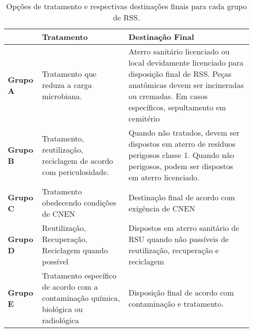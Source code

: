 \begin{table}[htbp]
  \centering
  \caption{Opções de tratamento e respectivas destinações finais para cada grupo de RSS.}
    \begin{tabular}{|p{5em}|p{13.645em}|p{18.07em}|}
    \toprule
    \rowcolor[rgb]{ .969,  .588,  .275} \multicolumn{1}{|c|}{} & \textbf{Tratamento} & \textbf{Destinação Final} \\
    \midrule
    \rowcolor[rgb]{ .976,  .737,  .541} \textbf{Grupo A} & Tratamento que reduza a carga microbiana. & Aterro sanitário licenciado ou local devidamente licenciado para disposição final de RSS. Peças anatômicas devem ser incineradas ou cremadas. Em casos específicos, sepultamento em cemitério \\
    \midrule
    \rowcolor[rgb]{ .992,  .914,  .851} \textbf{Grupo B} & Tratamento, reutilização, reciclagem de acordo com periculosidade. & Quando não tratados, devem ser dispostos em aterro de resíduos perigosos classe 1. Quando não perigosos, podem ser dispostos em aterro licenciado. \\
    \midrule
    \rowcolor[rgb]{ .976,  .737,  .541} \textbf{Grupo C} & Tratamento obedecendo condições de CNEN & Destinação final de acordo com exigência de CNEN \\
    \midrule
    \rowcolor[rgb]{ .992,  .914,  .851} \textbf{Grupo D} & Reutilização, Recuperação, Reciclagem quando possível & Dispostos em aterro sanitário de RSU quando não passíveis de reutilização, recuperação e reciclagem \\
    \midrule
    \rowcolor[rgb]{ .976,  .737,  .541} \textbf{Grupo E} & Tratamento específico de acordo com a contaminação química, biológica ou radiológica & Disposição final de acordo com contaminação e tratamento. \\
    \bottomrule
    \end{tabular}%
  \label{tab:tratamento_rss}%
\end{table}%
